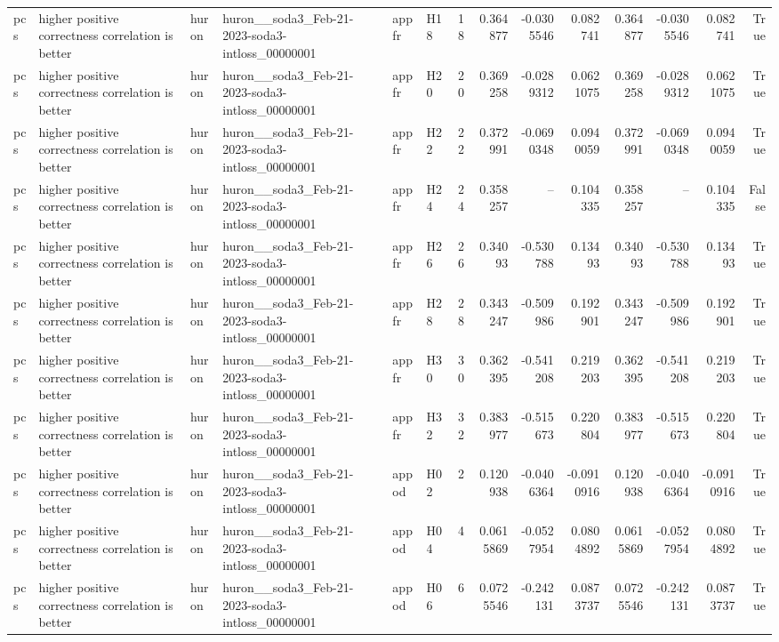 \begin{longtable}{llllllrrrrrrrr}
pcs & higher positive correctness correlation is better & huron & huron\_\_soda3\_Feb-21-2023-soda3-intloss\_00000001 & appfr & H18 & 18 & 0.364877 & -0.0305546 & 0.082741 & 0.364877 & -0.0305546 & 0.082741 & True \\
pcs & higher positive correctness correlation is better & huron & huron\_\_soda3\_Feb-21-2023-soda3-intloss\_00000001 & appfr & H20 & 20 & 0.369258 & -0.0289312 & 0.0621075 & 0.369258 & -0.0289312 & 0.0621075 & True \\
pcs & higher positive correctness correlation is better & huron & huron\_\_soda3\_Feb-21-2023-soda3-intloss\_00000001 & appfr & H22 & 22 & 0.372991 & -0.0690348 & 0.0940059 & 0.372991 & -0.0690348 & 0.0940059 & True \\
pcs & higher positive correctness correlation is better & huron & huron\_\_soda3\_Feb-21-2023-soda3-intloss\_00000001 & appfr & H24 & 24 & 0.358257 & -- & 0.104335 & 0.358257 & -- & 0.104335 & False \\
pcs & higher positive correctness correlation is better & huron & huron\_\_soda3\_Feb-21-2023-soda3-intloss\_00000001 & appfr & H26 & 26 & 0.34093 & -0.530788 & 0.13493 & 0.34093 & -0.530788 & 0.13493 & True \\
pcs & higher positive correctness correlation is better & huron & huron\_\_soda3\_Feb-21-2023-soda3-intloss\_00000001 & appfr & H28 & 28 & 0.343247 & -0.509986 & 0.192901 & 0.343247 & -0.509986 & 0.192901 & True \\
pcs & higher positive correctness correlation is better & huron & huron\_\_soda3\_Feb-21-2023-soda3-intloss\_00000001 & appfr & H30 & 30 & 0.362395 & -0.541208 & 0.219203 & 0.362395 & -0.541208 & 0.219203 & True \\
pcs & higher positive correctness correlation is better & huron & huron\_\_soda3\_Feb-21-2023-soda3-intloss\_00000001 & appfr & H32 & 32 & 0.383977 & -0.515673 & 0.220804 & 0.383977 & -0.515673 & 0.220804 & True \\
pcs & higher positive correctness correlation is better & huron & huron\_\_soda3\_Feb-21-2023-soda3-intloss\_00000001 & appod & H02 & 2 & 0.120938 & -0.0406364 & -0.0910916 & 0.120938 & -0.0406364 & -0.0910916 & True \\
pcs & higher positive correctness correlation is better & huron & huron\_\_soda3\_Feb-21-2023-soda3-intloss\_00000001 & appod & H04 & 4 & 0.0615869 & -0.0527954 & 0.0804892 & 0.0615869 & -0.0527954 & 0.0804892 & True \\
pcs & higher positive correctness correlation is better & huron & huron\_\_soda3\_Feb-21-2023-soda3-intloss\_00000001 & appod & H06 & 6 & 0.0725546 & -0.242131 & 0.0873737 & 0.0725546 & -0.242131 & 0.0873737 & True \\

\end{longtable}
